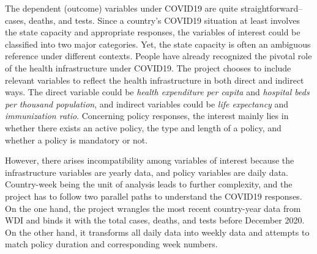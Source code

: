 \documentclass[12pt]{class}
\begin{document}
The dependent (outcome) variables under COVID19 are quite straightforward-- cases, deaths, and tests. Since a country’s COVID19 situation at least involves the state capacity and appropriate responses, the variables of interest could be classified into two major categories. Yet, the state capacity is often an ambiguous reference under different contexts. People have already recognized the pivotal role of the health infrastructure under COVID19. The project chooses to include relevant variables to reflect the health infrastructure in both direct and indirect ways. The direct variable could be \textit{health expenditure per capita} and \textit{hospital beds per thousand population}, and indirect variables could be \textit{life expectancy} and \textit{immunization ratio}. Concerning policy responses, the interest mainly lies in whether there exists an active policy, the type and length of a policy, and whether a policy is mandatory or not. \par 

However, there arises incompatibility among variables of interest because the infrastructure variables are yearly data, and policy variables are daily data. Country-week being the unit of analysis leads to further complexity, and the project has to follow two parallel paths to understand the COVID19 responses. On the one hand, the project wrangles the most recent country-year data from WDI and binds it with the total cases, deaths, and tests before December 2020. On the other hand, it transforms all daily data into weekly data and attempts to match policy duration and corresponding week numbers. \par 
\end{document}
